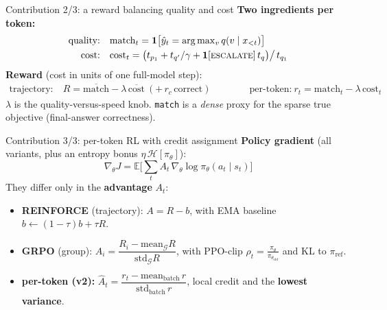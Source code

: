 \documentclass[aspectratio=169,11pt]{beamer}
\begin{document}
\begin{frame}{Contribution 2/3: a reward balancing quality and cost}
\textbf{Two ingredients per token:}
\begin{align*}
\text{quality:}\quad & \text{match}_t = \mathbf{1}\big[\hat y_t = \arg\max\nolimits_v q(v\mid x_{<t})\big] \\[-1pt]
\text{cost:}\quad & \text{cost}_t = \big(t_{p_1} + t_{q'}/\gamma + \mathbf{1}[\textsc{escalate}]\,t_q\big)\big/\,t_{q_1}
\end{align*}
\textbf{Reward} (cost in units of one full-model step):
\begin{align*}
\text{trajectory:}\ & R = \overline{\text{match}} - \lambda\,\overline{\text{cost}}\ (+\,r_c\,\text{correct})
\qquad\qquad
\text{per-token:}\ r_t = \text{match}_t - \lambda\,\text{cost}_t
\end{align*}
\centering\footnotesize $\lambda$ is the quality-versus-speed knob. \texttt{match} is a \emph{dense} proxy for the
sparse true objective (final-answer correctness).
\end{frame}

\begin{frame}{Contribution 3/3: per-token RL with credit assignment}
\textbf{Policy gradient} (all variants, plus an entropy bonus $\eta\,\mathcal{H}[\pi_\theta]$):
\[
\nabla_\theta J = \mathbb{E}\Big[\textstyle\sum_t A_t\,\nabla_\theta \log \pi_\theta(a_t\mid s_t)\Big]
\]
They differ only in the \textbf{advantage} $A_t$:
\begin{itemize}\small
  \item \textbf{REINFORCE} (trajectory): $A = R - b$, with EMA baseline $b\leftarrow(1{-}\tau)b+\tau R$.
  \item \textbf{GRPO} (group): $A_i = \dfrac{R_i-\mathrm{mean}_{\mathcal G}R}{\mathrm{std}_{\mathcal G}R}$, with PPO-clip $\rho_t=\frac{\pi_\theta}{\pi_{\theta_{\text{old}}}}$ and KL to $\pi_{\text{ref}}$.
  \item \textbf{per-token (v2):} $\hat A_t = \dfrac{r_t-\mathrm{mean}_{\text{batch}}\,r}{\mathrm{std}_{\text{batch}}\,r}$, local credit and the \textbf{lowest variance}.
\end{itemize}
\end{frame}
\end{document}
